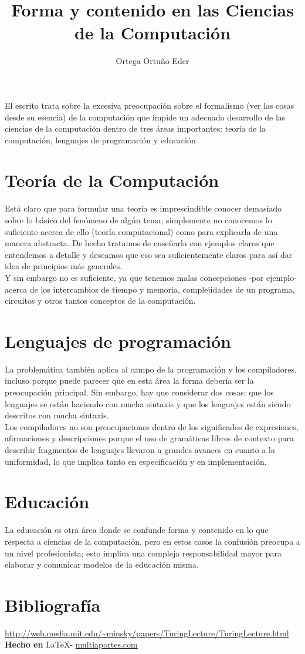 \documentclass{article}
\title{Forma y contenido en las Ciencias de la Computación}
\author{Ortega Ortu\~no Eder}
\date{} %
\begin{document}
	\maketitle
	\normalsize{
El escrito trata sobre la excesiva preocupación sobre el formalismo (ver las cosas desde su esencia) de la computación que impide un adecuado desarrollo de las ciencias de la computación dentro de tres áreas importantes: teoría de la computación, lenguajes de programación y educación.

\section*{Teoría de la Computación}
Está claro que para formular una teoría es imprescindible conocer demasiado sobre lo básico del fenómeno de algún tema; simplemente no conocemos lo suficiente acerca de ello (teoría computacional) como para explicarla de una manera abstracta. De hecho tratamos de enseñarla con ejemplos claros que entendemos a detalle y deseamos que eso sea suficientemente claros para así dar idea de principios más generales.
\\

Y sin embargo no es suficiente, ya que tenemos malas concepciones -por ejemplo- acerca de los intercambios de tiempo y memoria, complejidades de un programa, circuitos y otros tantos conceptos de la computación.

\section*{Lenguajes de programación}
La problemática también aplica al campo de la programación y los compiladores, incluso porque puede parecer que en esta área la forma debería ser la preocupación principal. Sin embargo, hay que considerar dos cosas: que los lenguajes se están haciendo con mucha sintaxis y que los lenguajes están siendo descritos con mucha sintaxis.
\\

Los compiladores no son preocupaciones dentro de los significados de expresiones, afirmaciones y descripciones porque el uso de gramáticas libres de contexto para describir fragmentos de lenguajes llevaron a grandes avances en cuanto a la uniformidad, lo que implica tanto en especificación y en implementación.

\section*{Educación}
La educación es otra área donde se confunde forma y contenido en lo que respecta a ciencias de la computación, pero en estos casos la confusión preocupa a un nivel profesionista; esto implica una compleja responsabilidad mayor para elaborar y comunicar modelos de la educación misma.
}

\vspace{2cm}

\section*{Bibliograf\'ia}

\noindent \url{http://web.media.mit.edu/~minsky/papers/TuringLecture/TuringLecture.html}
\\

\large{\hfill \textbf{Hecho en } \LaTeX - \url{multiaportes.com}}
\end{document}
